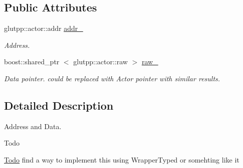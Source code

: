 \subsection*{\-Public \-Attributes}
\begin{DoxyCompactItemize}
\item 
\hypertarget{structglutpp_1_1network_1_1actor_1_1update_1_1addr__raw_a30478c5051b040fbaafb8fb138793517}{glutpp\-::actor\-::addr \hyperlink{structglutpp_1_1network_1_1actor_1_1update_1_1addr__raw_a30478c5051b040fbaafb8fb138793517}{addr\-\_\-}}\label{structglutpp_1_1network_1_1actor_1_1update_1_1addr__raw_a30478c5051b040fbaafb8fb138793517}

\begin{DoxyCompactList}\small\item\em \-Address. \end{DoxyCompactList}\item 
\hypertarget{structglutpp_1_1network_1_1actor_1_1update_1_1addr__raw_a78a532b30c2fe195ce15e420c25d45d7}{boost\-::shared\-\_\-ptr\*
$<$ glutpp\-::actor\-::raw $>$ \hyperlink{structglutpp_1_1network_1_1actor_1_1update_1_1addr__raw_a78a532b30c2fe195ce15e420c25d45d7}{raw\-\_\-}}\label{structglutpp_1_1network_1_1actor_1_1update_1_1addr__raw_a78a532b30c2fe195ce15e420c25d45d7}

\begin{DoxyCompactList}\small\item\em \-Data pointer. could be replaced with \-Actor pointer with similar results. \end{DoxyCompactList}\end{DoxyCompactItemize}


\subsection{\-Detailed \-Description}
\-Address and \-Data. 

\begin{DoxyRefDesc}{\-Todo}
\item[\hyperlink{todo__todo000008}{\-Todo}]find a way to implement this using \-Wrapper\-Typed or somehting like it \end{DoxyRefDesc}


